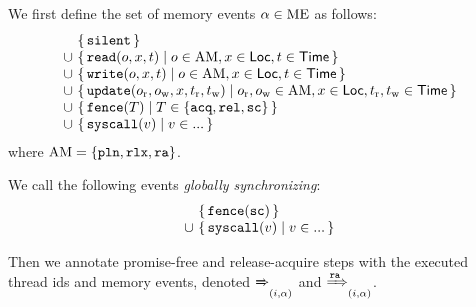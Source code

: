 \noindent
We first define the set of memory events $\alpha\in\textrm{ME}$ as follows:
\[
\begin{array}{@{}c@{~}l@{}}
 & \setof{\mesilent} \\
\cup& \setof{\meread(o,x,t) \suchthat o\in\AccMode ,x\in\Loc,t\in\Time } \\
\cup& \setof{\mewrite(o,x,t) \suchthat o\in\AccMode,x\in\Loc,t\in\Time} \\
\cup& \setof{\meupdate(o_\lr,o_\lw,x,t_\lr,t_\lw) \suchthat o_\lr,o_\lw\in\AccMode,x\in\Loc,t_\lr,t_\lw\in\Time } \\
\cup& \setof{\mefence(T) \suchthat T \in \setofz{\acqo,\relo,\sco} } \\
\cup& \setof{\mesyscall(v) \suchthat v \in ... } \\
\end{array}
\]
where $\mathrm{AM} = \{ \texttt{pln},\texttt{rlx},\texttt{ra} \}$. %

We call the following events \emph{globally synchronizing}:
\[
\begin{array}{@{}c@{~}l@{}}
& \setof{\mefence(\sco) } \\
\cup& \setof{\mesyscall(v) \suchthat v \in ... } \\
\end{array}
\]

Then we annotate promise-free and release-acquire steps with 
the executed thread ids and memory events, denoted $\xRightarrow{}_{(i,\alpha)}$ and $\xRightarrow{\texttt{ra}}_{(i,\alpha)}$.

